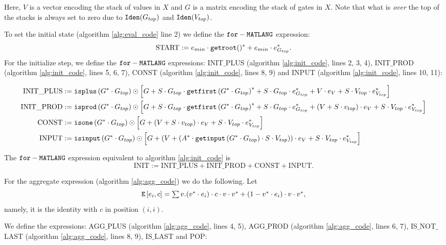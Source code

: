 Here, $V$ is a vector encoding the stack of values in $X$ and $G$ is a matrix encoding the stack of gates in $X$. Note that what is \textit{over} the top of the stacks is always set to zero due to $\texttt{Iden}(G_{top})$ and $\texttt{Iden}(V_{top})$.

To set the initial state (algorithm \ref{alg:eval_code} line 2) we define the $\texttt{for}-\texttt{MATLANG}$ expression: $$\text{START}:= e_{min}\cdot \texttt{getroot}()^* + e_{min}\cdot e_{G_{top}}^*.$$
For the initialize step, we define the $\texttt{for}-\texttt{MATLANG}$ expressions: INIT${\_}$PLUS (algorithm \ref{alg:init_code}, lines 2, 3, 4), INIT${\_}$PROD (algorithm \ref{alg:init_code}, lines 5, 6, 7), CONST (algorithm \ref{alg:init_code}, lines 8, 9) and INPUT (algorithm \ref{alg:init_code}, lines 10, 11):

\begin{align*}
	\text{INIT{\_}PLUS} &:= \texttt{isplus}\left( G^*\cdot G_{top} \right)\odot \left[ G + S\cdot G_{top} \cdot \texttt{getfirst}\left(G^*\cdot G_{top} \right)^*  + S\cdot G_{top}\cdot e_{G_{top}}^* +V\cdot e_{V} + S\cdot V_{top}\cdot e_{V_{top}}^* \right] \\
	\text{INIT{\_}PROD} &:= \texttt{isprod}\left(G^*\cdot G_{top} \right)\odot \left[ G + S\cdot G_{top} \cdot \texttt{getfirst}\left(G^*\cdot G_{top} \right)^* + S\cdot G_{top}\cdot e_{G_{top}}^* +(V + S\cdot v_{top})\cdot e_{V} + S\cdot V_{top}\cdot e_{V_{top}}^* \right] \\
	\text{CONST} &:= \texttt{isone}\left(G^*\cdot G_{top} \right)\odot \left[ G + (V + S\cdot v_{top})\cdot e_{V} + S\cdot V_{top}\cdot e_{V_{top}}^* \right] \\
	\text{INPUT} &:= \texttt{isinput}\left(G^*\cdot G_{top} \right)\odot \left[ G + \left(V + \left( A^* \cdot \texttt{getinput}\left(G^*\cdot G_{top} \right) \cdot S\cdot V_{top} \right)\right)\cdot e_{V} + S\cdot V_{top}\cdot e_{V_{top}}^* \right]
\end{align*}

The $\texttt{for}-\texttt{MATLANG}$ expression equivalent to algorithm \ref{alg:init_code} is $$\text{INIT}:=\text{INIT{\_}PLUS}+\text{INIT{\_}PROD}+\text{CONST}+\text{INPUT}.$$

For the aggregate expression (algorithm \ref{alg:agg_code}) we do the following. Let $$\texttt{E}\left[ e_i, c \right]=\textstyle\sum v. (v^*\cdot e_i)\cdot c\cdot v\cdot v^* + (1-v^*\cdot e_i)\cdot v \cdot v^*,$$ namely, it is the identity with $c$ in position $(i,i)$.

We define the expressions: AGG${\_}$PLUS (algorithm \ref{alg:agg_code}, lines 4, 5), AGG${\_}$PROD (algorithm \ref{alg:agg_code}, lines 6, 7),  IS${\_}$NOT${\_}$LAST (algorithm \ref{alg:agg_code}, lines 8, 9), IS${\_}$LAST and POP:

